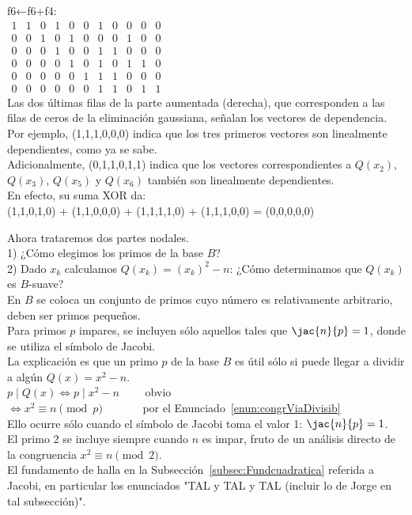 \begin{ejemplo}
f6←f6+f4: \\
$\begin{array}{ccccc|cccccc}
1&1&0&1&0&0&1&0&0&0&0\\
0&0&1&0&1&0&0&0&1&0&0\\
0&0&0&1&0&0&1&1&0&0&0\\
0&0&0&0&1&0&1&0&1&1&0\\
0&0&0&0&0&1&1&1&0&0&0\\
0&0&0&0&0&0&1&1&0&1&1
\end{array}$ \\
Las dos últimas filas de la parte aumentada (derecha), que corresponden a las filas de ceros de la eliminación gaussiana, señalan los vectores de dependencia.\\
Por ejemplo, (1,1,1,0,0,0) indica que los tres primeros vectores son linealmente dependientes, como ya se sabe. \\
Adicionalmente, (0,1,1,0,1,1) indica que los vectores correspondientes a $Q(x_2)$, $Q(x_3)$, $Q(x_5)$ y $Q(x_6)$ también son linealmente dependientes. \\
En efecto, su suma XOR da: \\
(1,1,0,1,0) + (1,1,0,0,0) + (1,1,1,1,0) + (1,1,1,0,0) = (0,0,0,0,0) \\
\end{ejemplo}

Ahora trataremos dos partes nodales. \\
1) ¿Cómo elegimos los primos de la base $B$? \\
2) Dado $x_k$ calculamos $Q(x_k)=(x_k)^2 - n$: ¿Cómo determinamos que $Q(x_k)$ es $B$-suave? \\

En $B$ se coloca un conjunto de primos cuyo número es relativamente arbitrario, deben ser primos pequeños. \\
Para primos $p$ impares, se incluyen sólo aquellos tales que $\jac{n}{p}=1$, donde se utiliza el símbolo de Jacobi. \\
La explicación es que un primo $p$ de la base $B$ es útil sólo si puede llegar a dividir a algún $Q(x) = x^2 - n$. \\
$p \mid Q(x) \iff p \mid x^2 - n \qquad$ obvio \\
$\iff x^2 \equiv n \pmod p \qquad\quad\;$ por el Enunciado~\ref{enun:congrViaDivisib} \\
Ello ocurre sólo cuando el símbolo de Jacobi toma el valor 1: $\jac{n}{p} = 1$. \\
El primo 2 se incluye siempre cuando $n$ es impar, fruto de un análisis directo de la congruencia $x^2 \equiv n \pmod 2$. \\
El fundamento de halla en la Subsección~\ref{subsec:Fundcuadratica} referida a Jacobi, en particular los enunciados "TAL y TAL y TAL (incluir lo de Jorge en tal subsección)". 

